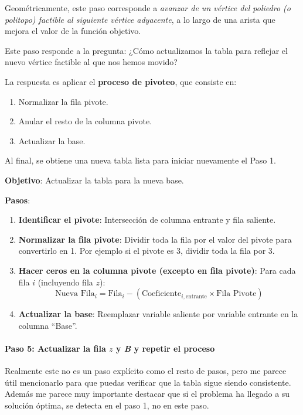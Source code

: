 Geométricamente, este paso corresponde a \textit{avanzar de un vértice del poliedro (o politopo) factible al siguiente vértice adyacente}, a lo largo de una arista que mejora el valor de la función objetivo.

Este paso responde a la pregunta: ¿Cómo actualizamos la tabla para reflejar el nuevo vértice factible al que nos hemos movido?

La respuesta es aplicar el \textbf{proceso de pivoteo}, que consiste en:
\begin{enumerate}
  \item Normalizar la fila pivote.
  \item Anular el resto de la columna pivote.
  \item Actualizar la base.
\end{enumerate}

Al final, se obtiene una nueva tabla lista para iniciar nuevamente el Paso 1.

\begin{tcolorbox}[title=Resumen del paso 4]
  \noindent \textbf{Objetivo}: Actualizar la tabla para la nueva base.
  
  \noindent \textbf{Pasos}:
  \begin{enumerate}
    \item \textbf{Identificar el pivote}: Intersección de columna entrante y fila saliente.
    \item \textbf{Normalizar la fila pivote}: Dividir toda la fila por el valor del pivote para convertirlo en 1. Por ejemplo si el pivote es 3, dividir toda la fila por 3.
    \item \textbf{Hacer ceros en la columna pivote (excepto en fila pivote)}: Para cada fila \(i\) (incluyendo fila \(z\)):
       \[
       \text{Nueva Fila}_i = \text{Fila}_i - (\text{Coeficiente}_{i,\text{entrante}} \times \text{Fila Pivote})
       \]
    \item \textbf{Actualizar la base}: Reemplazar variable saliente por variable entrante en la columna ``Base''.
  \end{enumerate}
\end{tcolorbox}

\paragraph{Paso 5: Actualizar la fila \(z\) y \textit{B} y repetir el proceso}

Realmente este no es un paso explícito como el resto de pasos, pero me parece útil mencionarlo para que puedas verificar que la tabla sigue siendo consistente. Además me parece muy importante destacar que si el problema ha llegado a su solución óptima, se detecta en el paso 1, no en este paso.

